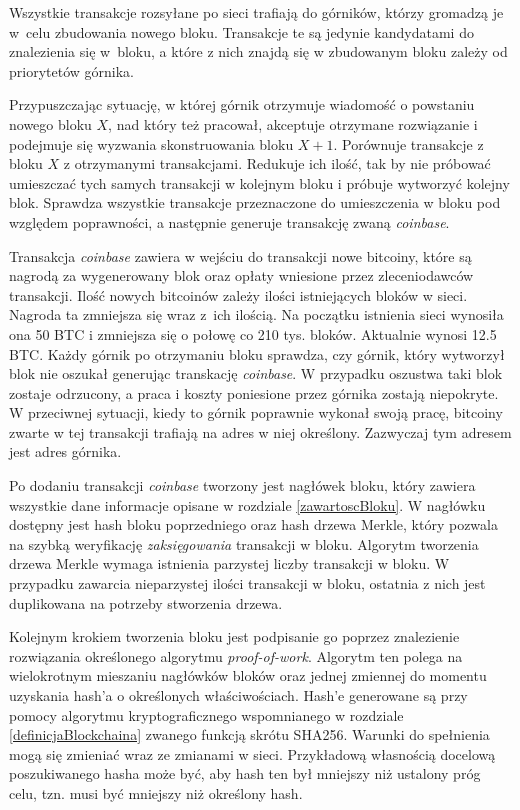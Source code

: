 \documentclass[12pt, twoside, final, openany]{mgr}
\begin{document}
\indent Wszystkie transakcje rozsyłane po sieci trafiają do górników, którzy gromadzą je w~celu zbudowania nowego bloku. Transakcje te są jedynie kandydatami do znalezienia się w~bloku, a które z nich znajdą się w zbudowanym bloku zależy od priorytetów górnika. 

\indent Przypuszczając sytuację, w której górnik otrzymuje wiadomość o powstaniu nowego bloku $X$, nad który też pracował, akceptuje otrzymane rozwiązanie i podejmuje się wyzwania skonstruowania bloku $X+1$. Porównuje transakcje z bloku $X$ z otrzymanymi transakcjami. Redukuje ich ilość, tak by nie próbować umieszczać tych samych transakcji w kolejnym bloku i próbuje wytworzyć kolejny blok. Sprawdza wszystkie transakcje przeznaczone do umieszczenia w bloku pod względem poprawności, a następnie generuje transakcję zwaną \textit{coinbase}. 

\indent Transakcja \textit{coinbase} zawiera w wejściu do transakcji nowe bitcoiny, które są nagrodą za wygenerowany blok oraz opłaty wniesione przez zleceniodawców transakcji. Ilość nowych bitcoinów zależy ilości istniejących bloków w sieci. Nagroda ta zmniejsza się wraz z~ich ilością. Na początku istnienia sieci wynosiła ona 50 BTC i zmniejsza się o połowę co 210 tys. bloków. Aktualnie wynosi 12.5 BTC. Każdy górnik po otrzymaniu bloku sprawdza, czy górnik, który wytworzył blok nie oszukał generując transkację \textit{coinbase}. W przypadku oszustwa taki blok zostaje odrzucony, a praca i koszty poniesione przez górnika zostają niepokryte. W przeciwnej sytuacji, kiedy to górnik poprawnie wykonał swoją pracę, bitcoiny zwarte w tej transakcji trafiają na adres w niej określony. Zazwyczaj tym adresem jest adres górnika.

\indent Po dodaniu transakcji \textit{coinbase} tworzony jest nagłówek bloku, który zawiera wszystkie dane informacje opisane w rozdziale \ref{zawartoscBloku}. W nagłówku dostępny jest hash bloku poprzedniego oraz hash drzewa Merkle, który pozwala na szybką weryfikację \textit{zaksięgowania} transakcji w bloku. Algorytm tworzenia drzewa Merkle wymaga istnienia parzystej liczby transakcji w bloku. W przypadku zawarcia nieparzystej ilości transakcji w bloku, ostatnia z nich jest duplikowana na potrzeby stworzenia drzewa.

\indent Kolejnym krokiem tworzenia bloku jest podpisanie go poprzez znalezienie rozwiązania określonego algorytmu \textit{proof-of-work}. Algorytm ten polega na wielokrotnym mieszaniu nagłówków bloków oraz jednej zmiennej do momentu uzyskania hash'a o określonych właściwościach. Hash'e generowane są przy pomocy algorytmu kryptograficznego wspomnianego w rozdziale \ref{definicjaBlockchaina} zwanego funkcją skrótu SHA256. Warunki do spełnienia mogą się zmieniać wraz ze zmianami w sieci. Przykładową własnością docelową poszukiwanego hasha może być, aby hash ten był mniejszy niż ustalony próg celu, tzn. musi być mniejszy niż określony hash.
\end{document}
